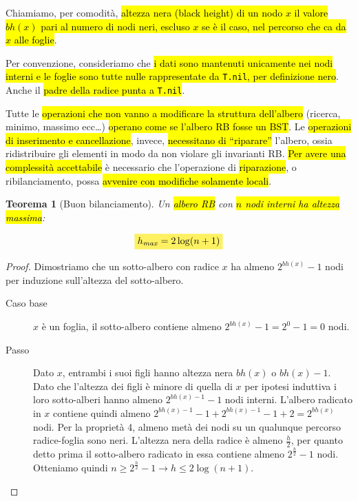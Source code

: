 \documentclass[a4paper,11pt,oneside]{article}
\theoremstyle{plain}
\newtheorem{thm}{Teorema}[section]
\theoremstyle{definition}
\theoremstyle{remark}
\newcommand{\mhl}[1]{\colorbox{hlcolor}{$\displaystyle #1$}}
\begin{document}
Chiamiamo, per comodità, \hl{altezza nera (black height) di un nodo $x$ il
valore $bh(x)$ pari al numero di nodi neri, escluso $x$ se è il caso, nel
percorso che ca da $x$ alle foglie}.

Per convenzione, consideriamo che \hl{i dati sono mantenuti unicamente nei nodi
interni e le foglie sono tutte nulle rappresentate da \texttt{T.nil}, per
definizione nero}. Anche il \hl{padre della radice punta a \texttt{T.nil}}.

Tutte le \hl{operazioni che non vanno a modificare la struttura dell'albero}
(ricerca, minimo, massimo ecc\ldots) \hl{operano come se l'albero RB fosse un
BST}. Le \hl{operazioni di inserimento e cancellazione}, invece,
\hl{necessitano di ``riparare''} l'albero, ossia ridistribuire gli elementi in
modo da non violare gli invarianti RB. \hl{Per avere una complessità
accettabile} è necessario che l'operazione di \hl{riparazione}, o
ribilanciamento, possa \hl{avvenire con modifiche solamente locali}.

\begin{thm}[Buon bilanciamento]\label{thm:rb-bilanciamento}
  Un \hl{albero RB} con \hl{$n$ nodi interni ha altezza massima}:

  \begin{equation}
    \mhl{
      h_{\mathit{max}} = 2\log(n+1)
    }
  \end{equation}
\end{thm}
\begin{proof}
  Dimostriamo che un sotto-albero con radice $x$ ha almeno $2^{bh(x)} - 1$ nodi
  per induzione sull'altezza del sotto-albero.

  \begin{description}
    \item[Caso base] $x$ è un foglia, il sotto-albero contiene almeno
      $2^{bh(x)} - 1 = 2^0 - 1 = 0$ nodi.
    \item[Passo] Dato $x$, entrambi i suoi figli hanno altezza nera $bh(x)$ o
      $bh(x) - 1$. Dato che l'altezza dei figli è minore di quella di $x$ per
      ipotesi induttiva i loro sotto-alberi hanno almeno $2^{bh(x)-1} - 1$ nodi
      interni. L'albero radicato in $x$ contiene quindi almeno
      $2^{bh(x)-1} - 1 + 2^{bh(x)-1} - 1 + 2 = 2^{bh(x)}$ nodi. Per la proprietà
      4, almeno metà dei nodi su un qualunque percorso radice-foglia sono neri.
      L'altezza nera della radice è almeno $\frac{h}{2}$, per quanto detto prima
      il sotto-albero radicato in essa contiene almeno $2^\frac{h}{2} - 1$ nodi.
      Otteniamo quindi $n \geq 2^\frac{h}{2} - 1 \to h \leq 2\log(n + 1)$.
  \end{description}
\end{proof}
\end{document}
